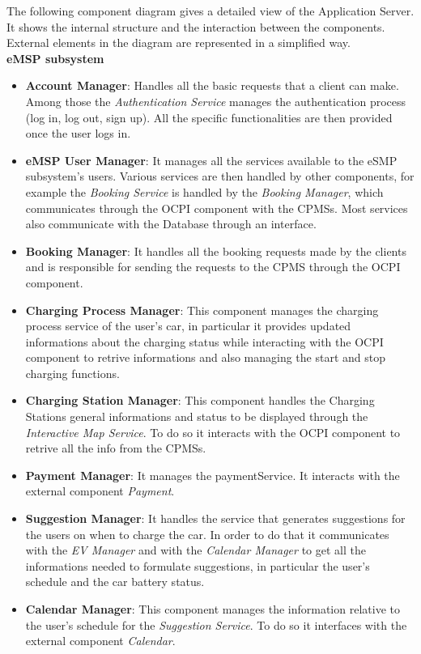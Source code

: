 \documentclass[table, 12pt]{article}
\begin{document}
The following component diagram gives a detailed view of the Application Server. It shows the internal structure and the interaction between the components.
External elements in the diagram are represented in a simplified way.
\\
\textbf{eMSP subsystem}
\begin{itemize}
    \item \textbf{Account Manager}: Handles all the basic requests that a client can make. Among those the \textit{Authentication Service} manages the authentication process (log in, log out, sign up). All the specific functionalities are then provided once the user logs in.
    \item \textbf{eMSP User Manager}: It manages all the services available to the eSMP subsystem's users. Various services are then handled by other components, for example the \textit{Booking Service} is handled by the \textit{Booking Manager}, which communicates through the OCPI component with the CPMSs. Most services also communicate with the Database through an interface.
    \item \textbf{Booking Manager}: It handles all the booking requests made by the clients and is responsible for sending the requests to the CPMS through the OCPI component.
    \item \textbf{Charging Process Manager}: This component manages the charging process service of the user's car, in particular it provides updated informations about the charging status while interacting with the OCPI component to retrive informations and also managing the start and stop charging functions.
    \item \textbf{Charging Station Manager}: This component  handles the Charging Stations general informations and status to be displayed through the \textit{Interactive Map Service}. To do so it interacts with the OCPI component to retrive all the info from the CPMSs.
    \item \textbf{Payment Manager}: It manages the paymentService. It interacts with the external component \textit{Payment}.
    \item \textbf{Suggestion Manager}: It handles the service that generates suggestions for the users on when to charge the car. In order to do that it communicates with the \textit{EV Manager} and with the \textit{Calendar Manager} to get all the informations needed to formulate suggestions, in particular the user's schedule and the car battery status.
    \item \textbf{Calendar Manager}: This component manages the information relative to the user's schedule for the \textit{Suggestion Service}. To do so it interfaces with the external component \textit{Calendar}.

\end{itemize}
\end{document}
